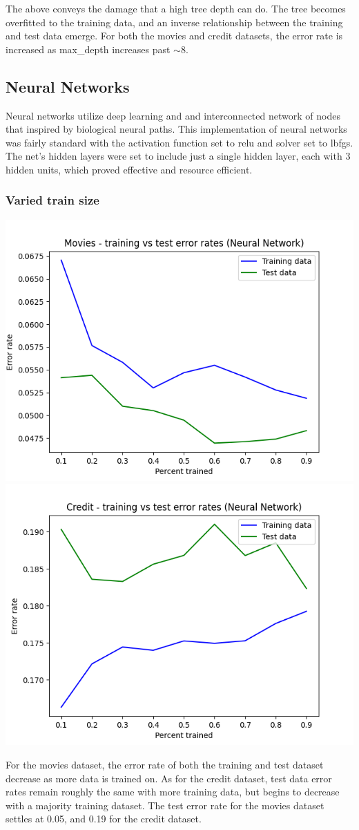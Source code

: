 \documentclass{article}
\begin{document}
The above conveys the damage that a high tree depth can do. The tree becomes overfitted to the training data, and an inverse relationship between the training and test data emerge. For both the movies and credit datasets, the error rate is increased as max\_depth increases past $\sim 8$.
\subsection{Neural Networks}

Neural networks utilize deep learning and and interconnected network of nodes that inspired by biological neural paths. This implementation of neural networks was fairly standard with the activation function set to relu and solver set to lbfgs. The net's hidden layers were set to include just a single hidden layer, each with 3 hidden units, which proved effective and resource efficient.

\subsubsection{Varied train size}

\begin{center}
    \includegraphics[width=.45\linewidth]{movies-neural_net-error.png}
    \includegraphics[width=.45\linewidth]{credit-neural_net-error.png}
\end{center}

For the movies dataset, the error rate of both the training and test dataset decrease as more data is trained on. As for the credit dataset, test data error rates remain roughly the same with more training data, but begins to decrease with a majority training dataset. The test error rate for the movies dataset settles at 0.05, and 0.19 for the credit dataset.
\end{document}
